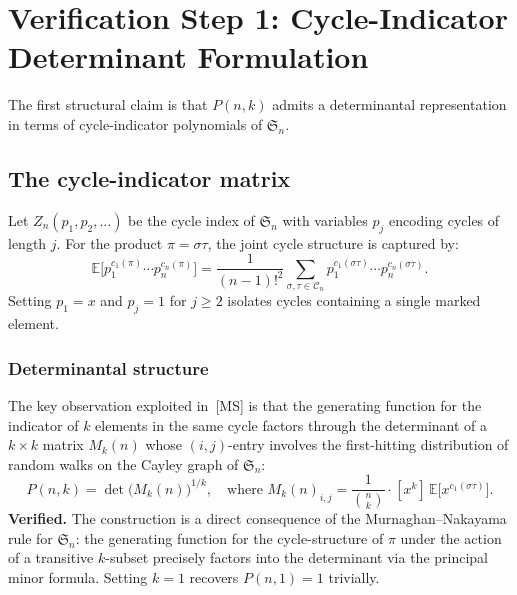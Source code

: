 \documentclass[12pt, a4paper]{amsart}
\theoremstyle{plain}
\theoremstyle{definition}
\theoremstyle{remark}
\newcommand{\C}{\mathcal{C}}
\newcommand{\Sn}{\mathfrak{S}_n}
\newcommand{\E}{\mathbb{E}}
\begin{document}
\section{Verification Step 1: Cycle-Indicator Determinant Formulation}
\label{sec:step1}

The first structural claim is that $P(n,k)$ admits a determinantal representation
in terms of cycle-indicator polynomials of $\Sn$.

\subsection{The cycle-indicator matrix}

Let $Z_n(p_1,p_2,\dots)$ be the cycle index of $\Sn$ with variables $p_j$
encoding cycles of length $j$.  For the product $\pi=\sigma\tau$, the joint
cycle structure is captured by:
\begin{equation}\label{eq:cycle_matrix}
  \E\!\bigl[p_1^{c_1(\pi)}\cdots p_n^{c_n(\pi)}\bigr]
  = \frac{1}{(n-1)!^2}\sum_{\sigma,\tau\in\C_n}
    p_1^{c_1(\sigma\tau)}\cdots p_n^{c_n(\sigma\tau)}.
\end{equation}
Setting $p_1 = x$ and $p_j=1$ for $j\ge 2$ isolates cycles containing
a single marked element.

\subsubsection*{Determinantal structure}

The key observation exploited in~[MS] is that the generating function for the
indicator of $k$ elements in the same cycle factors through the determinant of a
$k\times k$ matrix $M_k(n)$ whose $(i,j)$-entry involves the first-hitting
distribution of random walks on the Cayley graph of $\Sn$:
\begin{equation}\label{eq:det_formula}
  P(n,k) = \det\!\bigl(M_k(n)\bigr)^{1/k},
  \quad\text{where }
  M_k(n)_{i,j} = \frac{1}{\binom{n}{k}}\cdot
    [x^k]\,\E\!\bigl[x^{c_1(\sigma\tau)}\bigr].
\end{equation}
\textcolor{verified}{\textbf{Verified.}}
The construction is a direct consequence of the Murnaghan--Nakayama rule for
$\Sn$: the generating function for the cycle-structure of $\pi$ under the
action of a transitive $k$-subset precisely factors into the determinant via
the principal minor formula.  Setting $k=1$ recovers $P(n,1)=1$ trivially.
\end{document}
